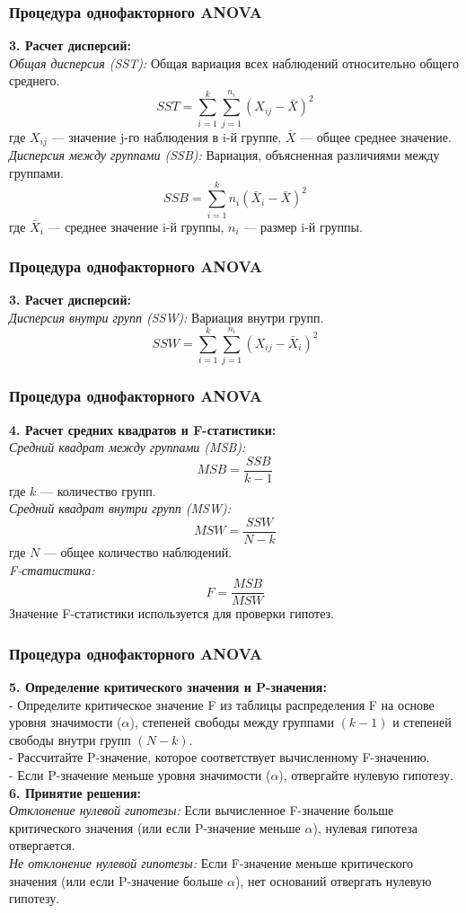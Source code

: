 \documentclass[aspectratio=169]{beamer}
\begin{document}
\begin{frame}
\frametitle{Процедура однофакторного ANOVA}
{\bf 3. Расчет дисперсий:}\\
{\it Общая дисперсия (SST):} Общая вариация всех наблюдений относительно общего среднего.
  \[
  SST = \sum_{i=1}^{k} \sum_{j=1}^{n_i} (X_{ij} - \bar{X})^2
  \]
где \( X_{ij} \) — значение j-го наблюдения в i-й группе, \( \bar{X} \) — общее среднее значение.\\
{\it Дисперсия между группами (SSB):} Вариация, объясненная различиями между группами.
  \[
  SSB = \sum_{i=1}^{k} n_i (\bar{X}_i - \bar{X})^2
  \]
где \( \bar{X}_i \) — среднее значение i-й группы, \( n_i \) — размер i-й группы.
\end{frame}

\begin{frame}
\frametitle{Процедура однофакторного ANOVA}
{\bf 3. Расчет дисперсий:}\\
{\it Дисперсия внутри групп (SSW):} Вариация внутри групп.
  \[
  SSW = \sum_{i=1}^{k} \sum_{j=1}^{n_i} (X_{ij} - \bar{X}_i)^2
  \]
\end{frame}

\begin{frame}
\frametitle{Процедура однофакторного ANOVA}
{\bf 4. Расчет средних квадратов и F-статистики:}\\
{\it Средний квадрат между группами (MSB):}\\
  \[
  MSB = \frac{SSB}{k - 1}
  \]
где \( k \) — количество групп.\\
{\it Средний квадрат внутри групп (MSW):}\\
  \[
  MSW = \frac{SSW}{N - k}
  \]
где \( N \) — общее количество наблюдений.\\
{\it F-статистика:}
  \[
  F = \frac{MSB}{MSW}
  \]
Значение F-статистики используется для проверки гипотез.
\end{frame}

\begin{frame}
\frametitle{Процедура однофакторного ANOVA}
{\bf 5. Определение критического значения и P-значения:}\\
- Определите критическое значение F из таблицы распределения F на основе уровня значимости ($\alpha$), степеней свободы между группами \( (k - 1) \) и степеней свободы внутри групп \( (N - k) \).\\
- Рассчитайте P-значение, которое соответствует вычисленному F-значению.\\
- Если P-значение меньше уровня значимости ($\alpha$), отвергайте нулевую гипотезу.\\
{\bf 6. Принятие решения:}\\
{\it Отклонение нулевой гипотезы:} Если вычисленное F-значение больше критического значения (или если P-значение меньше $\alpha$), нулевая гипотеза отвергается.\\
{\it Не отклонение нулевой гипотезы:} Если F-значение меньше критического значения (или если P-значение больше $\alpha$), нет оснований отвергать нулевую гипотезу.
\end{frame}
\end{document}
